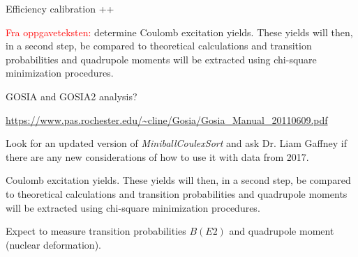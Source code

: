 \documentclass[twoside,english]{uiofysmaster/uiofysmaster}
\begin{document}
\bigskip

Efficiency calibration ++

\bigskip

\textcolor{red}{Fra oppgaveteksten:} \newline
determine Coulomb excitation yields. These yields will then, in a second step, be compared to theoretical calculations and transition probabilities and quadrupole moments will be extracted using chi-square minimization procedures.


GOSIA and GOSIA2 analysis?

\url{https://www.pas.rochester.edu/~cline/Gosia/Gosia_Manual_20110609.pdf}

\bigskip

Look for an updated version of \textsl{MiniballCoulexSort} and ask Dr. Liam Gaffney if there are any new considerations of how to use it with data from 2017.

\bigskip

Coulomb excitation yields. These yields will then, in a second step, be compared to theoretical calculations and transition probabilities and quadrupole moments will be extracted using chi-square minimization procedures.

\bigskip

Expect to measure transition probabilities $B(E2)$ and quadrupole moment (nuclear deformation). 







\end{document}
